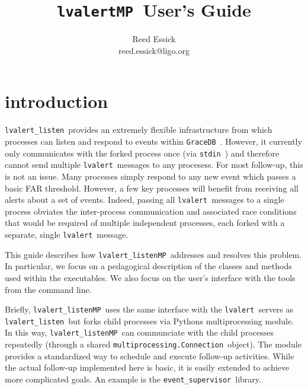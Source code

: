 \documentclass{article}
\newcommand{\stdin}{\texttt{stdin}~}
\newcommand{\multiprocessingConnection}{\texttt{multiprocessing.Connection}~}
\newcommand{\GraceDB}{\texttt{GraceDB}~}
\newcommand{\alert}{\texttt{lvalert}~}
\newcommand{\lvalertListen}{\texttt{lvalert\_listen}~}
\newcommand{\lvalertMP}{\texttt{lvalertMP}~}
\newcommand{\lvalertListenMP}{\texttt{lvalert\_listenMP}~}
\newcommand{\eventSupervisor}{\texttt{event\_supervisor}~}
\begin{document}

\title{
\lvalertMP User's Guide
}

\author{
Reed Essick \\
reed.essick@ligo.org
}

\maketitle

\newpage


\tableofcontents
\listoffigures

\newpage


\section{introduction}

\lvalertListen provides an extremely flexible infrastructure from which processes can listen and respond to events within \GraceDB. 
However, it currently only communicates with the forked process once (via \stdin) and therefore cannot send multiple \alert messages to any procesess.
For most follow-up, this is not an issue.
Many processes simply respond to any new event which passes a basic FAR threshold. 
However, a few key processes will benefit from receiving all alerts about a set of events.
Indeed, passing all \alert messages to a single process obviates the inter-process communication and associated race conditions that would be required of multiple independent processes, each forked with a separate, single \alert message.

This guide describes how \lvalertListenMP addresses and resolves this problem. 
In particular, we focus on a pedagogical description of the classes and methods used within the executables.
We also focus on the user's interface with the tools from the command line.

Briefly, \lvalertListenMP uses the same interface with the \alert servers as \lvalertListen but forks child processes via Pythons multiprocessing module.
In this way, \lvalertListenMP can communciate with the child processes repeatedly (through a shared \multiprocessingConnection object).
The module provides a standardized way to schedule and execute follow-up activities.
While the actual follow-up implemented here is basic, it is easily extended to achieve more complicated goals.
An example is the \eventSupervisor library.
\end{document}
